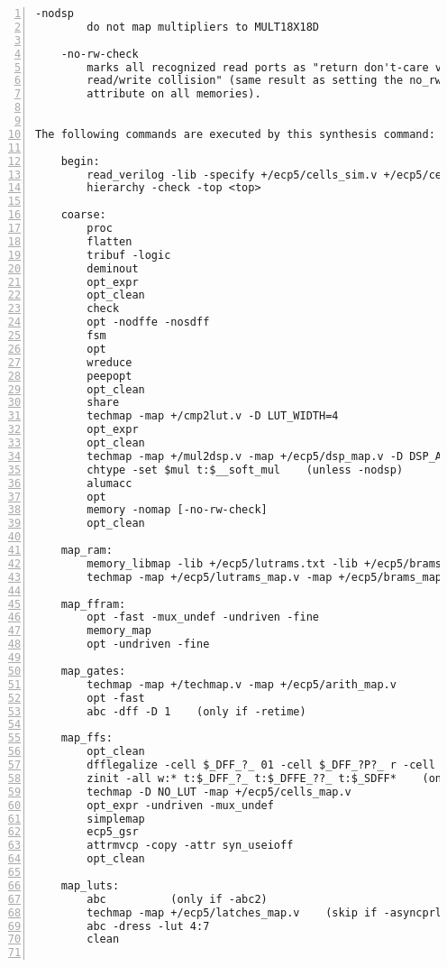 \begin{lstlisting}[numbers=left,frame=single]
    -nodsp
        do not map multipliers to MULT18X18D

    -no-rw-check
        marks all recognized read ports as "return don't-care value on
        read/write collision" (same result as setting the no_rw_check
        attribute on all memories).


The following commands are executed by this synthesis command:

    begin:
        read_verilog -lib -specify +/ecp5/cells_sim.v +/ecp5/cells_bb.v
        hierarchy -check -top <top>

    coarse:
        proc
        flatten
        tribuf -logic
        deminout
        opt_expr
        opt_clean
        check
        opt -nodffe -nosdff
        fsm
        opt
        wreduce
        peepopt
        opt_clean
        share
        techmap -map +/cmp2lut.v -D LUT_WIDTH=4
        opt_expr
        opt_clean
        techmap -map +/mul2dsp.v -map +/ecp5/dsp_map.v -D DSP_A_MAXWIDTH=18 -D DSP_B_MAXWIDTH=18  -D DSP_A_MINWIDTH=2 -D DSP_B_MINWIDTH=2  -D DSP_NAME=$__MUL18X18    (unless -nodsp)
        chtype -set $mul t:$__soft_mul    (unless -nodsp)
        alumacc
        opt
        memory -nomap [-no-rw-check]
        opt_clean

    map_ram:
        memory_libmap -lib +/ecp5/lutrams.txt -lib +/ecp5/brams.txt [-no-auto-block] [-no-auto-distributed]    (-no-auto-block if -nobram, -no-auto-distributed if -nolutram)
        techmap -map +/ecp5/lutrams_map.v -map +/ecp5/brams_map.v

    map_ffram:
        opt -fast -mux_undef -undriven -fine
        memory_map
        opt -undriven -fine

    map_gates:
        techmap -map +/techmap.v -map +/ecp5/arith_map.v
        opt -fast
        abc -dff -D 1    (only if -retime)

    map_ffs:
        opt_clean
        dfflegalize -cell $_DFF_?_ 01 -cell $_DFF_?P?_ r -cell $_SDFF_?P?_ r [-cell $_DFFE_??_ 01 -cell $_DFFE_?P??_ r -cell $_SDFFE_?P??_ r] [-cell $_ALDFF_?P_ x -cell $_ALDFFE_?P?_ x] [-cell $_DLATCH_?_ x]    ($_ALDFF_*_ only if -asyncprld, $_DLATCH_* only if not -asyncprld, $_*DFFE_* only if not -nodffe)
        zinit -all w:* t:$_DFF_?_ t:$_DFFE_??_ t:$_SDFF*    (only if -abc9 and -dff)
        techmap -D NO_LUT -map +/ecp5/cells_map.v
        opt_expr -undriven -mux_undef
        simplemap
        ecp5_gsr
        attrmvcp -copy -attr syn_useioff
        opt_clean

    map_luts:
        abc          (only if -abc2)
        techmap -map +/ecp5/latches_map.v    (skip if -asyncprld)
        abc -dress -lut 4:7
        clean


\end{lstlisting}
